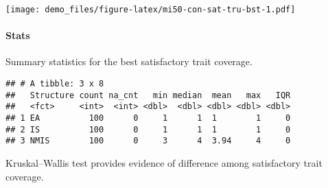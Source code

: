 \documentclass[]{book}
\newenvironment{Shaded}{\begin{snugshade}}{\end{snugshade}}
\newcommand{\CharTok}[1]{\textcolor[rgb]{0.31,0.60,0.02}{#1}}
\newcommand{\CommentTok}[1]{\textcolor[rgb]{0.56,0.35,0.01}{\textit{#1}}}
\newcommand{\DataTypeTok}[1]{\textcolor[rgb]{0.13,0.29,0.53}{#1}}
\newcommand{\KeywordTok}[1]{\textcolor[rgb]{0.13,0.29,0.53}{\textbf{#1}}}
\newcommand{\NormalTok}[1]{#1}
\newcommand{\OperatorTok}[1]{\textcolor[rgb]{0.81,0.36,0.00}{\textbf{#1}}}
\newcommand{\OtherTok}[1]{\textcolor[rgb]{0.56,0.35,0.01}{#1}}
\newcommand{\StringTok}[1]{\textcolor[rgb]{0.31,0.60,0.02}{#1}}
\let\oldparagraph\paragraph
\renewcommand{\paragraph}[1]{\oldparagraph{#1}\mbox{}}
\begin{document}
\texttt{[image: demo\_files/figure-latex/mi50-con-sat-tru-bst-1.pdf]}

\hypertarget{stats-36}{%
\paragraph{Stats}\label{stats-36}}

Summary statistics for the best satisfactory trait coverage.

\begin{Shaded}
\end{Shaded}

\begin{verbatim}
## # A tibble: 3 x 8
##   Structure count na_cnt   min median  mean   max   IQR
##   <fct>     <int>  <int> <dbl>  <dbl> <dbl> <dbl> <dbl>
## 1 EA          100      0     1      1  1        1     0
## 2 IS          100      0     1      1  1        1     0
## 3 NMIS        100      0     3      4  3.94     4     0
\end{verbatim}

Kruskal--Wallis test provides evidence of difference among satisfactory trait coverage.
\end{document}
